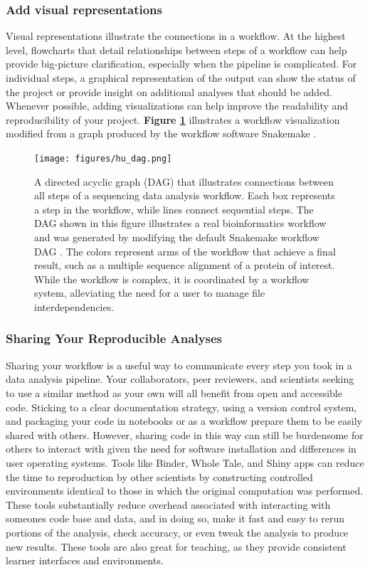\documentclass[10pt,letterpaper]{article}
\begin{document}
\subsubsection*{Add visual representations} 
Visual representations illustrate the connections in a workflow. 
At the highest level, flowcharts that detail relationships between steps of a workflow can help provide big-picture clarification, especially when the pipeline is complicated. 
For individual steps, a graphical representation of the output can show the status of the project or provide insight on additional analyses that should be added. 
Whenever possible, adding visualizations can help improve the readability and reproducibility of your project. \textbf{Figure \ref{fig:sgc_workflow}} illustrates a workflow visualization modified from a graph produced by the workflow software Snakemake \cite{brown2019exploring}. 

\begin{figure}
\texttt{[image: figures/hu\_dag.png]}
\caption{A directed acyclic graph (DAG) that illustrates connections between all steps of a sequencing data analysis workflow. Each box represents a step in the workflow, while lines connect sequential steps. The DAG shown in this figure illustrates a real bioinformatics workflow and was generated by modifying the default Snakemake workflow DAG \cite{brown2019exploring}. The colors represent arms of the workflow that achieve a final result, such as a multiple sequence alignment of a protein of interest. While the workflow is complex, it is coordinated by a workflow system, alleviating the need for a user to manage file interdependencies.}
\label{fig:sgc_workflow}
\end{figure}

\subsubsection*{Sharing Your Reproducible Analyses} 
Sharing your workflow is a useful way to communicate every step you took in a data analysis pipeline. 
Your collaborators, peer reviewers, and scientists seeking to use a similar method as your own will all benefit from open and accessible code. 
Sticking to a clear documentation strategy, using a version control system, and packaging your code in notebooks or as a workflow prepare them to be easily shared with others. 
However, sharing code in this way can still be burdensome for others to interact with given the need for software installation and differences in user operating systems. 
Tools like Binder, Whole Tale, and Shiny apps can reduce the time to reproduction by other scientists by constructing controlled environments identical to those in which the original computation was performed. 
These tools substantially reduce overhead associated with interacting with someones code base and data, and in doing so, make it fast and easy to rerun portions of the analysis, check accuracy, or even tweak the analysis to produce new results. 
These tools are also great for teaching, as they provide consistent learner interfaces and environments. 
\end{document}
